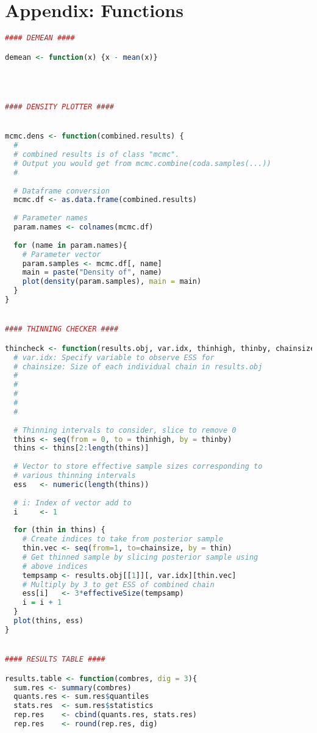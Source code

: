 \documentclass[11pt]{article}
\renewcommand\thesection{\arabic{section}}
\renewcommand\thesubsection{\thesection.\alph{subsection}}
\begin{document}
\newpage
\renewcommand\thesubsection{\thesection.\arabic{subsection}}
\setcounter{section}{0}

\appendix

\section{Appendix: Functions}
\begin{lstlisting}[language=R]
#### DEMEAN ####

demean <- function(x) {x - mean(x)}




#### DENSITY PLOTTER ####


mcmc.dens <- function(combined.results) {
  #
  # combined results is of class "mcmc". 
  # Output you would get from mcmc.combine(coda.samples(...))
  #
  
  # Dataframe conversion
  mcmc.df <- as.data.frame(combined.results)
  
  # Parameter names
  param.names <- colnames(mcmc.df)
  
  for (name in param.names){
    # Parameter vector
    param.samples <- mcmc.df[, name]
    main = paste("Density of", name)
    plot(density(param.samples), main = main)
  }
}


#### THINNING CHECKER ####

thincheck <- function(results.obj, var.idx, thinhigh, thinby, chainsize){
  # var.idx: Specify variable to observe ESS for
  # chainsize: Size of each individual chain in results.obj
  # 
  # 
  # 
  # 
  # 
  
  # Thinning intervals to consider, slice to remove 0
  thins <- seq(from = 0, to = thinhigh, by = thinby)
  thins <- thins[2:length(thins)]
  
  # Vector to store effective sample sizes corresponding to
  # various thinning intervals
  ess   <- numeric(length(thins))
  
  # i: Index of vector add to
  i     <- 1
  
  for (thin in thins) {
    # Create indices to take from posterior sample
    thin.vec <- seq(from=1, to=chainsize, by = thin)
    # Get thinned sample by slicing posterior sample using
    # above indices
    tempsamp <- results.obj[[1]][, var.idx][thin.vec]
    # Multiply by 3 to get ESS of combined chain
    ess[i]   <- 3*effectiveSize(tempsamp)
    i = i + 1
  }
  plot(thins, ess)
}


#### RESULTS TABLE ####

results.table <- function(combres, dig = 3){
  sum.res <- summary(combres)
  quants.res <- sum.res$quantiles
  stats.res  <- sum.res$statistics
  rep.res    <- cbind(quants.res, stats.res)
  rep.res    <- round(rep.res, dig)
  

\end{lstlisting}
\end{document}
